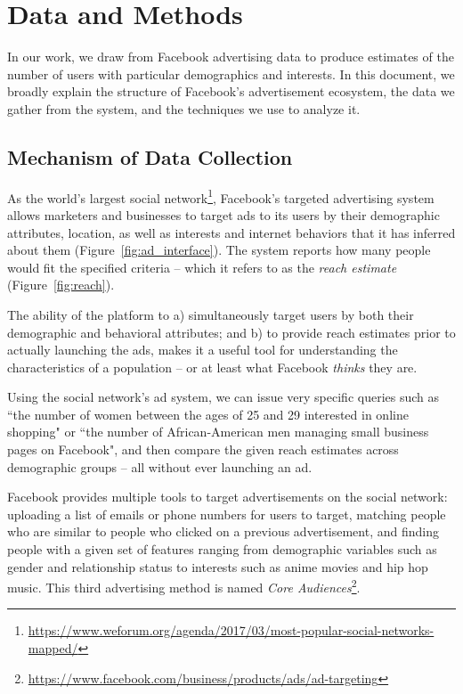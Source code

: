 \chapter{Data and Methods} \label{chap:data}
In our work, we draw from Facebook advertising data to produce estimates of the number of users with particular demographics and interests. In this document, we broadly explain the structure of Facebook's advertisement ecosystem, the data we gather from the system, and the techniques we use to analyze it.


\section{Mechanism of Data Collection} \label{sec:fb_ad_eco}

As the world's largest social network\footnote{\url{https://www.weforum.org/agenda/2017/03/most-popular-social-networks-mapped/}}, Facebook's targeted advertising system allows marketers and businesses to target ads to its users by their demographic attributes, location, as well as interests and internet behaviors that it has inferred about them (Figure~\ref{fig:ad_interface}). The system reports how many people would fit the specified criteria -- which it refers to as the \textit{reach estimate} (Figure~\ref{fig:reach}).

The ability of the platform to a) simultaneously target users by both their demographic and behavioral attributes; and b) to provide reach estimates prior to actually launching the ads, makes it a useful tool for understanding the characteristics of a population -- or at least what Facebook \textit{thinks} they are.

Using the social network's ad system, we can issue very specific queries such as ``the number of women between the ages of 25 and 29 interested in online shopping" or ``the number of African-American men managing small business pages on Facebook", and then compare the given reach estimates across demographic groups -- all without ever launching an ad.

Facebook provides multiple tools to target advertisements on the social network: uploading a list of emails or phone numbers for users to target, matching people who are similar to people who clicked on a previous advertisement, and finding people with a given set of features ranging from demographic variables such as gender and relationship status to interests such as anime movies and hip hop music. This third advertising method is named \textit{Core Audiences}\footnote{\url{https://www.facebook.com/business/products/ads/ad-targeting}}.

